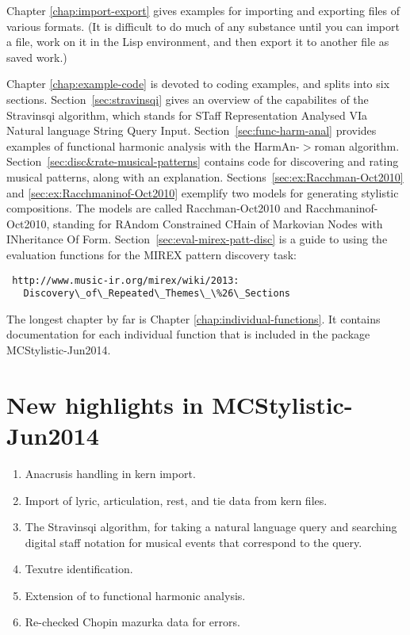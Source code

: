 Chapter \ref{chap:import-export} gives examples for importing and exporting files of various formats. (It is difficult to do much of any substance until you can import a file, work on it in the Lisp environment, and then export it to another file as saved work.)

Chapter \ref{chap:example-code} is devoted to coding examples, and splits into six sections. Section~\ref{sec:stravinsqi} gives an overview of the capabilites of the Stravinsqi algorithm, which stands for STaff Representation Analysed VIa Natural language String Query Input. Section~\ref{sec:func-harm-anal} provides examples of functional harmonic analysis with the HarmAn-$>$roman algorithm. Section~\ref{sec:disc&rate-musical-patterns} contains code for discovering and rating musical patterns, along with an explanation. Sections~\ref{sec:ex:Racchman-Oct2010} and \ref{sec:ex:Racchmaninof-Oct2010} exemplify two models for generating stylistic compositions. The models are called Racchman-Oct2010 and Racchmaninof-Oct2010, standing for RAndom Constrained CHain of Markovian Nodes with INheritance Of Form. Section~\ref{sec:eval-mirex-patt-disc} is a guide to using the evaluation functions for the MIREX pattern discovery task:
\begin{verbatim}
 http://www.music-ir.org/mirex/wiki/2013:
   Discovery\_of\_Repeated\_Themes\_\%26\_Sections
\end{verbatim}

The longest chapter by far is Chapter \ref{chap:individual-functions}. It contains documentation for each individual function that is included in the package MCStylistic-Jun2014.

\section*{New highlights in MCStylistic-Jun2014}

\begin{enumerate}
\item Anacrusis handling in kern import.
\item Import of lyric, articulation, rest, and tie data from kern files.
\item The Stravinsqi algorithm, for taking a natural language query and searching digital staff notation for musical events that correspond to the query.
\item Texutre identification.
\item Extension of  to functional harmonic analysis.
\item Re-checked Chopin mazurka data for errors.
\end{enumerate}

